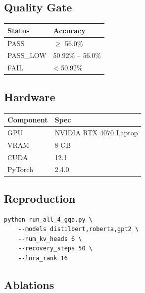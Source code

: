 \subsection{Quality Gate}

\begin{table}[H]
\centering
\small
\begin{tabular}{ll}
\toprule
\textbf{Status} & \textbf{Accuracy} \\
\midrule
PASS & $\ge$ 56.0\% \\
PASS\_LOW & 50.92\% -- 56.0\% \\
FAIL & < 50.92\% \\
\bottomrule
\end{tabular}
\end{table}

\subsection{Hardware}

\begin{table}[H]
\centering
\small
\begin{tabular}{ll}
\toprule
\textbf{Component} & \textbf{Spec} \\
\midrule
GPU & NVIDIA RTX 4070 Laptop \\
VRAM & 8 GB \\
CUDA & 12.1 \\
PyTorch & 2.4.0 \\
\bottomrule
\end{tabular}
\end{table}

\subsection{Reproduction}

\begin{lstlisting}
python run_all_4_gqa.py \
    --models distilbert,roberta,gpt2 \
    --num_kv_heads 6 \
    --recovery_steps 50 \
    --lora_rank 16
\end{lstlisting}

\subsection{Ablations}
